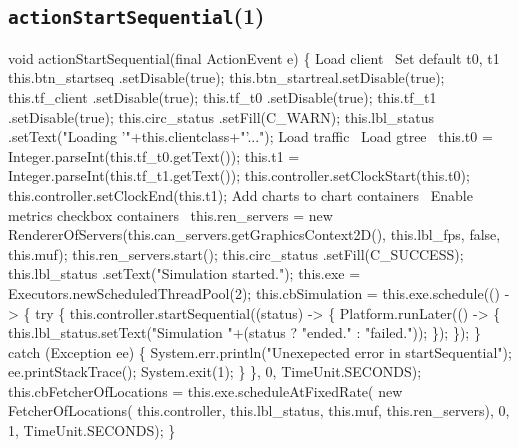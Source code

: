 \subsection{\texttt{actionStartSequential}(1)}
\nwenddocs{}\endmoddef{}
void actionStartSequential(final ActionEvent e) \{
  \LA{}Load client~{\nwtagstyle{}}\RA{}
  \LA{}Set default t0, t1~{\nwtagstyle{}}\RA{}
  this.btn_startseq .setDisable(true);
  this.btn_startreal.setDisable(true);
  this.tf_client     .setDisable(true);
  this.tf_t0        .setDisable(true);
  this.tf_t1        .setDisable(true);
  this.circ_status  .setFill(C_WARN);
  this.lbl_status   .setText("Loading '"+this.clientclass+"'...");
  \LA{}Load traffic~{\nwtagstyle{}}\RA{}
  \LA{}Load gtree~{\nwtagstyle{}}\RA{}
  this.t0 = Integer.parseInt(this.tf_t0.getText());
  this.t1 = Integer.parseInt(this.tf_t1.getText());
  this.controller.setClockStart(this.t0);
  this.controller.setClockEnd(this.t1);
  \LA{}Add charts to chart containers~{\nwtagstyle{}}\RA{}
  \LA{}Enable metrics checkbox containers~{\nwtagstyle{}}\RA{}
  this.ren_servers = new RendererOfServers(this.can_servers.getGraphicsContext2D(), this.lbl_fps, false, this.muf);
  this.ren_servers.start();
  this.circ_status  .setFill(C_SUCCESS);
  this.lbl_status   .setText("Simulation started.");
  this.exe = Executors.newScheduledThreadPool(2);
  this.cbSimulation = this.exe.schedule(() -> \{
    try \{
      this.controller.startSequential((status) -> \{
        Platform.runLater(() -> \{
          this.lbl_status.setText("Simulation "+(status ? "ended." : "failed."));
        \});
      \});
    \} catch (Exception ee) \{
      System.err.println("Unexepected error in startSequential");
      ee.printStackTrace();
      System.exit(1);
    \}
  \}, 0, TimeUnit.SECONDS);
  this.cbFetcherOfLocations = this.exe.scheduleAtFixedRate(
      new FetcherOfLocations(
        this.controller, this.lbl_status, this.muf, this.ren_servers), 0, 1, TimeUnit.SECONDS);
\}
\eatline
{}\nwendcode{}\nwdocspar
